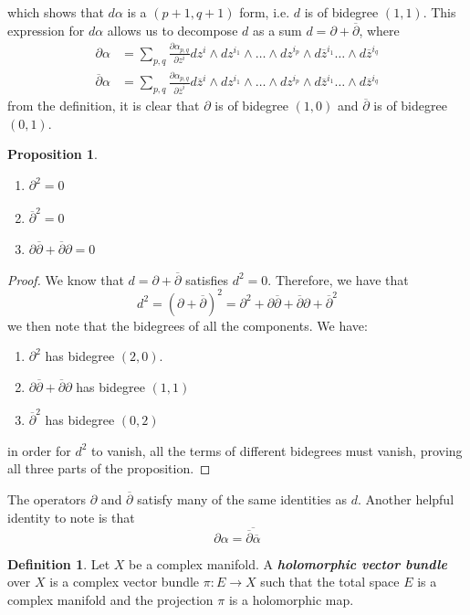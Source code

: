 \documentclass[psamsfonts, 12pt]{amsart}
\newtheorem{prop}[thm]{Proposition}
\theoremstyle{definition}
\newtheorem{defn}[thm]{Definition}
\theoremstyle{remark}
\newcommand{\ib}[1]{\textbf{\textit{#1}}}
\newcommand{\dbar}{\overline{\partial}}
\newcommand{\enumbreak}{\ \\ \vspace{-\baselineskip}}
\begin{document}
%
which shows that $d\alpha$ is a $(p+1,q+1)$ form, i.e. $d$ is of bidegree $(1,1)$. This
expression for $d\alpha$ allows us to decompose $d$ as a sum $d = \partial + \dbar$,
where
%
\begin{align*}
\partial\alpha &= \sum_{p,q}\frac{\partial\alpha_{p,q}}{\partial z^i} dz^i
\wedge dz^{i_1} \wedge \ldots \wedge dz^{i_p} \wedge
d\overline{z}^{i_1}\ldots \wedge d\overline{z}^{i_q} \\[5pt]
\dbar\alpha &= \sum_{p,q}\frac{\partial\alpha_{p,q}}{\partial \overline{z}^i}
d\overline{z}^i \wedge dz^{i_1} \wedge \ldots \wedge dz^{i_p} \wedge
d\overline{z}^{i_1}\ldots \wedge d\overline{z}^{i_q}
\end{align*}
%
from the definition, it is clear that $\partial$ is of bidegree $(1,0)$ and $\dbar$ is
of bidegree $(0,1)$.
%
\begin{prop}\enumbreak
\begin{enumerate}
  \item $\partial^2 = 0$
  \item $\dbar^2 = 0$
  \item $\partial\dbar + \dbar\partial = 0$
\end{enumerate}
\end{prop}
%
\begin{proof}
We know that $d = \partial + \dbar$ satisfies $d^2 = 0$. Therefore, we have that
\[
d^2 = (\partial +\dbar)^2 = \partial^2 + \partial\dbar + \dbar\partial + \dbar^2
\]
we then note that the bidegrees of all the components. We have:
\begin{enumerate}
  \item $\partial^2$ has bidegree $(2,0)$.
  \item $\partial\dbar + \dbar\partial$ has bidegree $(1,1)$
  \item $\dbar^2$ has bidegree $(0,2)$
\end{enumerate}
in order for $d^2$ to vanish, all the terms of different bidegrees must vanish, proving
all three parts of the proposition.
\end{proof}
%
The operators $\partial$ and $\dbar$ satisfy many of the same identities as $d$. Another
helpful identity to note is that
\[
\partial\alpha = \overline{\dbar\overline{\alpha}}
\]
\begin{defn}
Let $X$ be a complex manifold. A \ib{holomorphic vector bundle} over $X$ is a
complex vector bundle $\pi : E \to X$ such that the total space $E$ is a complex
manifold
and the projection $\pi$ is a holomorphic map.
\end{defn}
\end{document}
